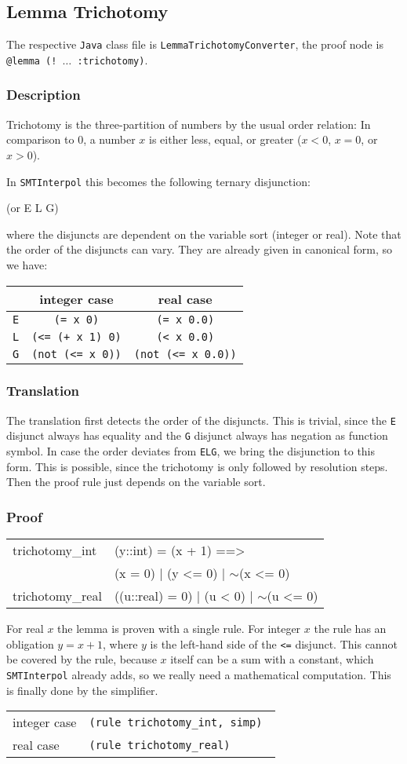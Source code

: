 \documentclass[10pt,a4paper]{article}
\newcommand{\si}{\texttt{SMTInterpol}\xspace}
\newcommand{\jav}{\texttt{Java}\xspace}
\newenvironment{formu}{\begin{center}\begin{tt}}{\end{tt}\end{center}}
\newcommand{\ttt}{\texttt}
\newcommand{\negat}{\ensuremath{\sim}}
\newcommand{\nega}{\negat\xspace}
\newenvironment{pt}[1]{\begin{center}\begin{tt}\begin{tabular}{#1}\hline}{\end{tabular}\end{tt}\end{center}}
\newcommand{\pl}[1]{#1 \\[1mm]}
\newcommand{\pll}[1]{#1 \\\hline}
\newenvironment{rt}{\begin{center}\begin{tabular}{|l l|}\hline}{\end{tabular}\end{center}}
\newcommand{\rl}[2]{\rm{#1} & \tt{#2} \\[1mm]}
\newcommand{\rll}[2]{\rm{#1} & \tt{#2} \\\hline}
\def\ind{\quad}
\begin{document}
\subsection{Lemma Trichotomy}\label{sec:tricho}
The respective \jav class file is \ttt{LemmaTrichotomyConverter}, the proof node is \ttt{@lemma (! $\dots$ :trichotomy)}.
%
\subsubsection*{Description}
Trichotomy is the three-partition of numbers by the usual order relation: In comparison to $0$, a number $x$ is either less, equal, or greater ($x < 0$, $x = 0$, or $x > 0$).

In \si this becomes the following ternary disjunction:
%
\begin{formu}
	(or E L G)
\end{formu}
%
where the disjuncts are dependent on the variable sort (integer or real). Note that the order of the disjuncts can vary. They are already given in canonical form, so we have:
%
\begin{center}
	\begin{tabular}{l|c|c}
		& integer case & real case \\
		\hline
		\ttt E & \ttt{(= x 0)} & \ttt{(= x 0.0)} \\
		\ttt L & \ttt{(<= (+ x 1) 0)} & \ttt{(< x 0.0)} \\
		\ttt G & \ttt{(not (<= x 0))} & \ttt{(not (<= x 0.0))}
	\end{tabular}
\end{center}
%
\subsubsection*{Translation}
The translation first detects the order of the disjuncts. This is trivial, since the \ttt{E} disjunct always has equality and the \ttt{G} disjunct always has negation as function symbol. In case the order deviates from \ttt{ELG}, we bring the disjunction to this form. This is possible, since the trichotomy is only followed by resolution steps. Then the proof rule just depends on the variable sort.
%
\subsubsection*{Proof}
\begin{pt}{ll}
	\pl{trichotomy\_int & (y::int) = (x + 1) ==> \\ & \ind (x = 0) | (y <= 0) | \nega (x <= 0)}
	\pll{trichotomy\_real & ((u::real) = 0) | (u < 0) | \nega (u <= 0)}
\end{pt}
%
For real $x$ the lemma is proven with a single rule. For integer $x$ the rule has an obligation $y = x + 1$, where $y$ is the left-hand side of the \ttt{<=} disjunct. This cannot be covered by the rule, because $x$ itself can be a sum with a constant, which \si already adds, so we really need a mathematical computation. This is finally done by the simplifier.
%
\begin{rt}
	\rl{integer case}{(rule trichotomy\_int, simp)}
	\rll{real case}{(rule trichotomy\_real)}
\end{rt}
%
\end{document}
